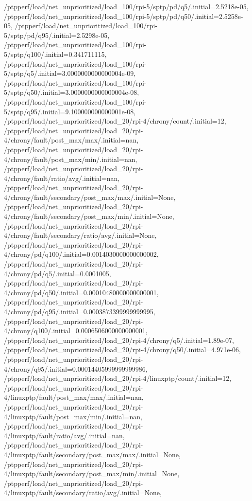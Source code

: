 {    /ptpperf/load/net_unprioritized/load_100/rpi-5/sptp/pd/q5/.initial=2.5218e-05,
    /ptpperf/load/net_unprioritized/load_100/rpi-5/sptp/pd/q50/.initial=2.5258e-05,
    /ptpperf/load/net_unprioritized/load_100/rpi-5/sptp/pd/q95/.initial=2.5298e-05,
    /ptpperf/load/net_unprioritized/load_100/rpi-5/sptp/q100/.initial=0.341711115,
    /ptpperf/load/net_unprioritized/load_100/rpi-5/sptp/q5/.initial=3.0000000000000004e-09,
    /ptpperf/load/net_unprioritized/load_100/rpi-5/sptp/q50/.initial=3.0000000000000004e-08,
    /ptpperf/load/net_unprioritized/load_100/rpi-5/sptp/q95/.initial=9.100000000000001e-08,
    /ptpperf/load/net_unprioritized/load_20/rpi-4/chrony/count/.initial=12,
    /ptpperf/load/net_unprioritized/load_20/rpi-4/chrony/fault/post_max/max/.initial=nan,
    /ptpperf/load/net_unprioritized/load_20/rpi-4/chrony/fault/post_max/min/.initial=nan,
    /ptpperf/load/net_unprioritized/load_20/rpi-4/chrony/fault/ratio/avg/.initial=nan,
    /ptpperf/load/net_unprioritized/load_20/rpi-4/chrony/fault/secondary/post_max/max/.initial=None,
    /ptpperf/load/net_unprioritized/load_20/rpi-4/chrony/fault/secondary/post_max/min/.initial=None,
    /ptpperf/load/net_unprioritized/load_20/rpi-4/chrony/fault/secondary/ratio/avg/.initial=None,
    /ptpperf/load/net_unprioritized/load_20/rpi-4/chrony/pd/q100/.initial=0.0014030000000000002,
    /ptpperf/load/net_unprioritized/load_20/rpi-4/chrony/pd/q5/.initial=0.0001005,
    /ptpperf/load/net_unprioritized/load_20/rpi-4/chrony/pd/q50/.initial=0.00010480000000000001,
    /ptpperf/load/net_unprioritized/load_20/rpi-4/chrony/pd/q95/.initial=0.0003873399999999995,
    /ptpperf/load/net_unprioritized/load_20/rpi-4/chrony/q100/.initial=0.0006506000000000001,
    /ptpperf/load/net_unprioritized/load_20/rpi-4/chrony/q5/.initial=1.89e-07,
    /ptpperf/load/net_unprioritized/load_20/rpi-4/chrony/q50/.initial=4.971e-06,
    /ptpperf/load/net_unprioritized/load_20/rpi-4/chrony/q95/.initial=0.00014405999999999986,
    /ptpperf/load/net_unprioritized/load_20/rpi-4/linuxptp/count/.initial=12,
    /ptpperf/load/net_unprioritized/load_20/rpi-4/linuxptp/fault/post_max/max/.initial=nan,
    /ptpperf/load/net_unprioritized/load_20/rpi-4/linuxptp/fault/post_max/min/.initial=nan,
    /ptpperf/load/net_unprioritized/load_20/rpi-4/linuxptp/fault/ratio/avg/.initial=nan,
    /ptpperf/load/net_unprioritized/load_20/rpi-4/linuxptp/fault/secondary/post_max/max/.initial=None,
    /ptpperf/load/net_unprioritized/load_20/rpi-4/linuxptp/fault/secondary/post_max/min/.initial=None,
    /ptpperf/load/net_unprioritized/load_20/rpi-4/linuxptp/fault/secondary/ratio/avg/.initial=None,
}
